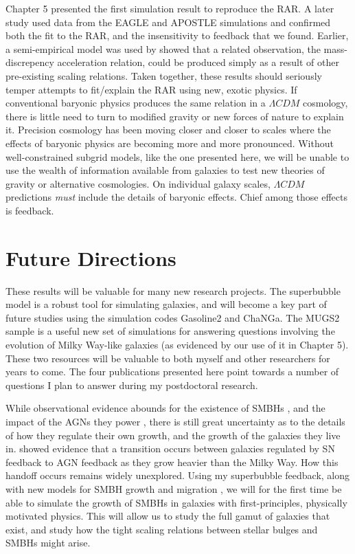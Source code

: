 Chapter 5 presented the first simulation result to reproduce the
\citet{McGaugh2016} RAR.  A later study \citep{Ludlow2016} used data from the
EAGLE \citep{Schaye2015} and APOSTLE \citep{Sawala2016} simulations and
confirmed both the fit to the RAR, and the insensitivity to feedback that we
found.  Earlier, a semi-empirical model was used by \citet{DiCintio2016} showed
that a related observation, the mass-discrepency acceleration relation, could
be produced simply as a result of other pre-existing scaling relations.  Taken
together, these results should seriously temper attempts to fit/explain the RAR
using new, exotic physics.  If conventional baryonic physics produces the same
relation in a $\Lambda CDM$ cosmology, there is little need to turn to modified
gravity \citep{Moffat2016,Verlinde2016} or new forces of nature
\citep{Burrage2016} to explain it.  Precision cosmology has been moving closer
and closer to scales where the effects of baryonic physics are becoming more and
more pronounced.  Without well-constrained subgrid models, like the one
presented here, we will be unable to use the wealth of information available
from galaxies to test new theories of gravity or alternative cosmologies.  On
individual galaxy scales, $\Lambda CDM$ predictions {\it must} include the
details of baryonic effects. Chief among those effects is feedback.

\section{Future Directions}
These results will be valuable for many new research projects.  The superbubble
model is a robust tool for simulating galaxies, and will become a key part of
future studies using the simulation codes {\sc Gasoline2} and {\sc ChaNGa}.  The
MUGS2 sample is a useful new set of simulations for answering questions
involving the evolution of Milky Way-like galaxies (as evidenced by our use of
it in Chapter 5).  These two resources will be valuable to both myself and other
researchers for years to come. The four publications presented here point
towards a number of questions I plan to answer during my postdoctoral research.  

While observational evidence abounds for the existence of SMBHs
\citep{Kormendy2013}, and the impact of the AGNs they power
\citep{Veilleux2005}, there is still great uncertainty as to the details of how
they regulate their own growth, and the growth of the galaxies they live in.
\citet{Keller2016a} showed evidence that a transition occurs between galaxies
regulated by SN feedback to AGN feedback as they grow heavier than the Milky
Way.  How this handoff occurs remains widely unexplored.  Using my superbubble
feedback, along with new models for SMBH growth \citep{Hopkins2010} and
migration \citep{Tremmel2015}, we will for the first time be able to simulate
the growth of SMBHs in galaxies with first-principles, physically motivated
physics.  This will allow us to study the full gamut of galaxies that exist, and
study how the tight scaling relations between stellar bulges and SMBHs might
arise.

